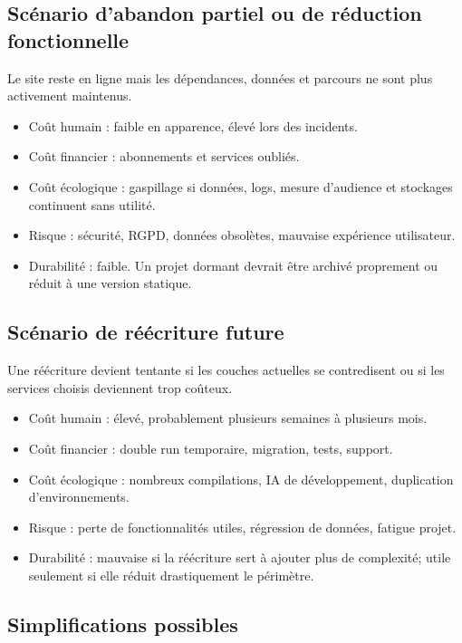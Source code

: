 \documentclass[
  10pt,
  a4paper,
  DIV=11,
  numbers=noendperiod,
  oneside]{scrreprt}
\begin{document}
\subsection{Scénario d'abandon partiel ou de réduction
fonctionnelle}\label{scuxe9nario-dabandon-partiel-ou-de-ruxe9duction-fonctionnelle}

Le site reste en ligne mais les dépendances, données et parcours ne sont
plus activement maintenus.

\begin{itemize}
\item
  Coût humain : faible en apparence, élevé lors des incidents.
\item
  Coût financier : abonnements et services oubliés.
\item
  Coût écologique : gaspillage si données, logs, mesure d'audience et
  stockages continuent sans utilité.
\item
  Risque : sécurité, RGPD, données obsolètes, mauvaise expérience
  utilisateur.
\item
  Durabilité : faible. Un projet dormant devrait être archivé proprement
  ou réduit à une version statique.
\end{itemize}

\subsection{Scénario de réécriture
future}\label{scuxe9nario-de-ruxe9uxe9criture-future}

Une réécriture devient tentante si les couches actuelles se contredisent
ou si les services choisis deviennent trop coûteux.

\begin{itemize}
\item
  Coût humain : élevé, probablement plusieurs semaines à plusieurs mois.
\item
  Coût financier : double run temporaire, migration, tests, support.
\item
  Coût écologique : nombreux compilations, IA de développement,
  duplication d'environnements.
\item
  Risque : perte de fonctionnalités utiles, régression de données,
  fatigue projet.
\item
  Durabilité : mauvaise si la réécriture sert à ajouter plus de
  complexité; utile seulement si elle réduit drastiquement le périmètre.
\end{itemize}

\subsection{Simplifications possibles}\label{simplifications-possibles}
\end{document}
